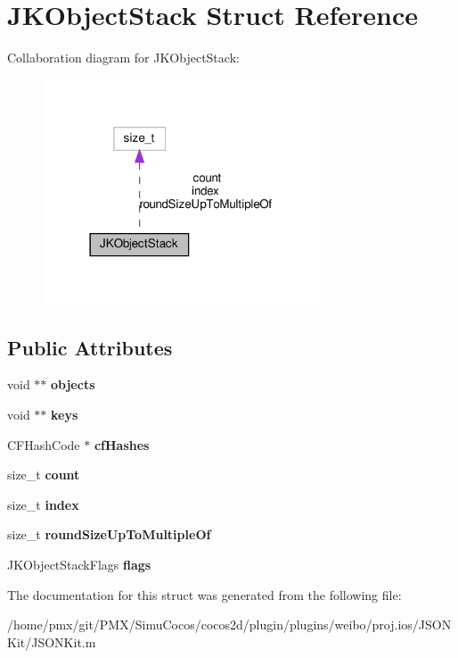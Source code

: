 \hypertarget{structJKObjectStack}{}\section{J\+K\+Object\+Stack Struct Reference}
\label{structJKObjectStack}


Collaboration diagram for J\+K\+Object\+Stack\+:
\nopagebreak
\begin{figure}[H]
\begin{center}
\leavevmode
\includegraphics[width=234pt]{structJKObjectStack__coll__graph}
\end{center}
\end{figure}
\subsection*{Public Attributes}
\begin{DoxyCompactItemize}
\item 
\mbox{\label{structJKObjectStack_a05d0aaccbbd97c2d2d9e21103a0f0674}} 
void $\ast$$\ast$ {\bfseries objects}
\item 
\mbox{\label{structJKObjectStack_ab68ecf2c44e86aa7a610a3f62569027d}} 
void $\ast$$\ast$ {\bfseries keys}
\item 
\mbox{\label{structJKObjectStack_a1182bd031d894877fe2a7963a5d857ce}} 
C\+F\+Hash\+Code $\ast$ {\bfseries cf\+Hashes}
\item 
\mbox{\label{structJKObjectStack_a41f8a4ef732a6871e2bf2527c063e97d}} 
size\+\_\+t {\bfseries count}
\item 
\mbox{\label{structJKObjectStack_a2ed7166eb043cc62224f829700bbf7e5}} 
size\+\_\+t {\bfseries index}
\item 
\mbox{\label{structJKObjectStack_ac0eac91125386d09f4d4834fdeed6356}} 
size\+\_\+t {\bfseries round\+Size\+Up\+To\+Multiple\+Of}
\item 
\mbox{\label{structJKObjectStack_ad2a26b250c96005e28cda8d2d493dfbe}} 
J\+K\+Object\+Stack\+Flags {\bfseries flags}
\end{DoxyCompactItemize}


The documentation for this struct was generated from the following file\+:\begin{DoxyCompactItemize}
\item 
/home/pmx/git/\+P\+M\+X/\+Simu\+Cocos/cocos2d/plugin/plugins/weibo/proj.\+ios/\+J\+S\+O\+N\+Kit/J\+S\+O\+N\+Kit.\+m\end{DoxyCompactItemize}
